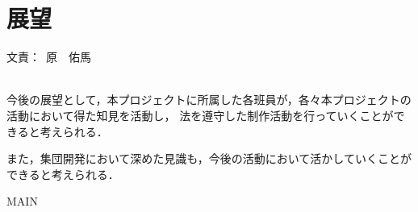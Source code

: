 \documentclass[a4paper]{jarticle}
\newcommand{\resp}[1]{\begin{flushright}文責：~#1\end{flushright}~\\}
\begin{document}
\fi

\section{展望}
  \resp{原　佑馬}

  今後の展望として，本プロジェクトに所属した各班員が，各々本プロジェクトの活動において得た知見を活動し，
  法を遵守した制作活動を行っていくことができると考えられる．

  また，集団開発において深めた見識も，今後の活動において活かしていくことができると考えられる．

\expandafter\ifx\csname MAIN\endcsname\relax
  
\end{document}
